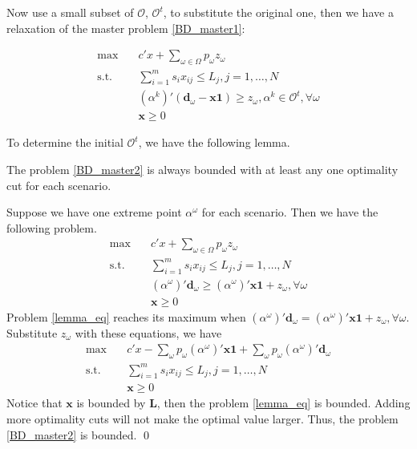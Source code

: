 Now use a small subset of $\mathcal{O}$, $\mathcal{O}^t$, to substitute the original one, then we have a relaxation of the master problem \eqref{BD_master1}:

\begin{equation}\label{BD_master2}
  \begin{aligned}
    \max \quad & c{'} x + \sum_{\omega \in \Omega} p_{\omega} z_{\omega} \\
    \text {s.t.} \quad & \sum_{i=1}^{m} s_{i} x_{ij} \leq L_j, j =1,\ldots, N \\
    & (\alpha^{k}){'}(\mathbf{d}_{\omega}- \mathbf{x} \mathbf{1}) \geq z_{\omega}, \alpha^k \in \mathcal{O}^{t}, \forall \omega \\
     & \mathbf{x} \geq 0
  \end{aligned}
\end{equation}


To determine the initial $\mathcal{O}^{t}$, we have the following lemma.

\begin{lem}\label{one_ep_feasible}
The problem \eqref{BD_master2} is always bounded with at least any one optimality cut for each scenario.
\end{lem}

\begin{pf}
  Suppose we have one extreme point $\alpha^{\omega}$ for each scenario. Then we have the following problem.
  \begin{equation}\label{lemma_eq}
    \begin{aligned}
      \max \quad & c{'} x + \sum_{\omega \in \Omega} p_{\omega} z_{\omega} \\
      \text {s.t.} \quad & \sum_{i=1}^{m} s_{i} x_{ij} \leq L_j, j =1,\ldots, N \\
      & (\alpha^{\omega}){'}\mathbf{d}_{\omega} \geq (\alpha^{\omega}){'} \mathbf{x} \mathbf{1} + z_{\omega}, \forall \omega \\
       & \mathbf{x} \geq 0
    \end{aligned}
  \end{equation}
  Problem \eqref{lemma_eq} reaches its maximum when $(\alpha^{\omega}){'}\mathbf{d}_{\omega} = (\alpha^{\omega}){'} \mathbf{x} \mathbf{1} + z_{\omega}, \forall \omega$. Substitute $z_{\omega}$ with these equations, we have 
  \begin{equation}\label{lemma_eq2}
    \begin{aligned}
      \max \quad & c{'} x - \sum_{\omega}p_{\omega}(\alpha^{\omega}){'} \mathbf{x} \mathbf{1} + \sum_{\omega} p_{\omega} (\alpha^{\omega}){'} \mathbf{d}_{\omega} \\
      \text {s.t.} \quad & \sum_{i=1}^{m} s_{i} x_{ij} \leq L_j, j =1,\ldots, N \\
      & \mathbf{x} \geq 0
    \end{aligned}
  \end{equation}
  Notice that $\mathbf{x}$ is bounded by $\mathbf{L}$, then the problem \eqref{lemma_eq} is bounded. Adding more optimality cuts will not make the optimal value larger. Thus, the problem \eqref{BD_master2} is bounded. 
  \qed
\end{pf}

